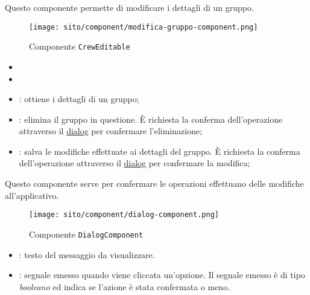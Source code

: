 \label{par:CrewEditable}

Questo componente permette di modificare i dettagli di un gruppo.  
\begin{figure}[H] 
    \centerline{\texttt{[image: sito/component/modifica-gruppo-component.png]}} 
    \caption{Componente \texttt{CrewEditable}}
\end{figure}
\begin{itemize}
    \item {}
    \item {}
\end{itemize}


\begin{itemize}
    \item {}: ottiene i dettagli di un gruppo;
    \item {}: elimina il gruppo in questione. È richiesta la conferma dell'operazione attraverso il \hyperref[par:Dialog]{dialog} per confermare l'eliminazione; 
    \item {}: salva le modifiche effettuate ai dettagli del gruppo. È richiesta la conferma dell'operazione attraverso il \hyperref[par:Dialog]{dialog} per confermare la modifica; 
\end{itemize}

\label{par:Dialog}
Questo componente serve per confermare le operazioni effettuano delle modifiche all'applicativo.

\begin{figure}[H] 
    \centering 
    \texttt{[image: sito/component/dialog-component.png]} 
    \caption{Componente \texttt{DialogComponent}}
\end{figure}

\begin{itemize}
    \item {}: testo del messaggio da visualizzare.
\end{itemize}

\begin{itemize}
    \item {}: segnale emesso quando viene cliccata un'opzione. Il segnale emesso è di tipo \textit{booleano} ed indica se l'azione è stata confermata o meno. 
\end{itemize}

